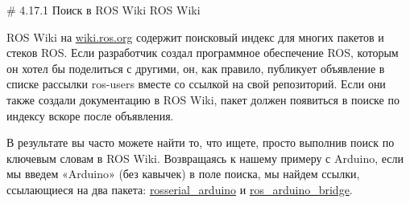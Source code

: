 # 4.17.1 Поиск в ROS Wiki ROS Wiki


ROS Wiki на \href{http://wiki.ros.org/}{wiki.ros.org} содержит поисковый индекс для многих пакетов и стеков ROS. Если разработчик создал программное обеспечение ROS, которым он хотел бы поделиться с другими, он, как правило, публикует объявление в списке рассылки ros-users вместе со ссылкой на свой репозиторий. Если они также создали документацию в ROS Wiki, пакет должен появиться в поиске по индексу вскоре после объявления.

 В результате вы часто можете найти то, что ищете, просто выполнив поиск по ключевым словам в ROS Wiki. Возвращаясь к нашему примеру с Arduino, если мы введем «Arduino» (без кавычек) в поле поиска, мы найдем ссылки, ссылающиеся на два пакета: \href{http://wiki.ros.org/rosserial_arduino}{rosserial\_arduino} и \href{http://wiki.ros.org/ros_arduino_bridge}{ros\_arduino\_bridge}.

